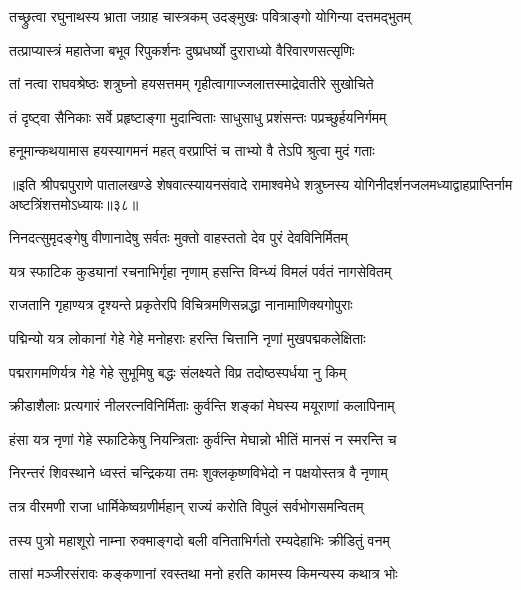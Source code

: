 \twolineshloka
{तच्छ्रुत्वा रघुनाथस्य भ्राता जग्राह चास्त्रकम्}
{उदङ्मुखः पवित्राङ्गो योगिन्या दत्तमद्भुतम्}%

\twolineshloka
{तत्प्राप्यास्त्रं महातेजा बभूव रिपुकर्शनः}
{दुष्प्रधर्ष्यो दुराराध्यो वैरिवारणसत्सृणिः}%

\twolineshloka
{तां नत्वा राघवश्रेष्ठः शत्रुघ्नो हयसत्तमम्}
{गृहीत्वागाज्जलात्तस्माद्रेवातीरे सुखोचिते}%

\twolineshloka
{तं दृष्ट्वा सैनिकाः सर्वे प्रहृष्टाङ्गा मुदान्विताः}
{साधुसाधु प्रशंसन्तः पप्रच्छुर्हयनिर्गमम्}%

\twolineshloka
{हनूमान्कथयामास हयस्यागमनं महत्}
{वरप्राप्तिं च ताभ्यो वै तेऽपि श्रुत्वा मुदं गताः}%

{॥इति श्रीपद्मपुराणे पातालखण्डे शेषवात्स्यायनसंवादे रामाश्वमेधे शत्रुघ्नस्य योगिनीदर्शनजलमध्याद्वाहप्राप्तिर्नाम अष्टत्रिंशत्तमोऽध्यायः॥३८॥}



\twolineshloka
{निनदत्सुमृदङ्गेषु वीणानादेषु सर्वतः}
{मुक्तो वाहस्ततो देव पुरं देवविनिर्मितम्}%

\twolineshloka
{यत्र स्फाटिक कुड्यानां रचनाभिर्गृहा नृणाम्}
{हसन्ति विन्ध्यं विमलं पर्वतं नागसेवितम्}%

\twolineshloka
{राजतानि गृहाण्यत्र दृश्यन्ते प्रकृतेरपि}
{विचित्रमणिसन्नद्धा नानामाणिक्यगोपुराः}%

\twolineshloka
{पद्मिन्यो यत्र लोकानां गेहे गेहे मनोहराः}
{हरन्ति चित्तानि नृणां मुखपद्मकलेक्षिताः}%

\twolineshloka
{पद्मरागमणिर्यत्र गेहे गेहे सुभूमिषु}
{बद्धः संलक्ष्यते विप्र तदोष्ठस्पर्धया नु किम्}%

\twolineshloka
{क्रीडाशैलाः प्रत्यगारं नीलरत्नविनिर्मिताः}
{कुर्वन्ति शङ्कां मेघस्य मयूराणां कलापिनाम्}%

\twolineshloka
{हंसा यत्र नृणां गेहे स्फाटिकेषु नियन्त्रिताः}
{कुर्वन्ति मेघान्नो भीतिं मानसं न स्मरन्ति च}%

\twolineshloka
{निरन्तरं शिवस्थाने ध्वस्तं चन्द्रिकया तमः}
{शुक्लकृष्णविभेदो न पक्षयोस्तत्र वै नृणाम्}%

\twolineshloka
{तत्र वीरमणी राजा धार्मिकेष्वग्रणीर्महान्}
{राज्यं करोति विपुलं सर्वभोगसमन्वितम्}%

\twolineshloka
{तस्य पुत्रो महाशूरो नाम्ना रुक्माङ्गदो बली}
{वनिताभिर्गतो रम्यदेहाभिः क्रीडितुं वनम्}%

\twolineshloka
{तासां मञ्जीरसंरावः कङ्कणानां रवस्तथा}
{मनो हरति कामस्य किमन्यस्य कथात्र भोः}%

